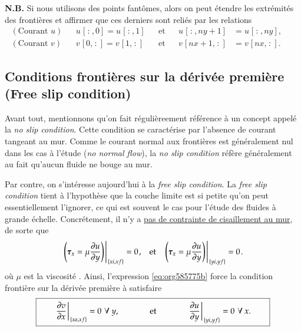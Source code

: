 \documentclass[10pt]{article}
\numberwithin{equation}{section}
\newcommand{\bigno}{\vphantom{\qty(\frac{d}{q})}}
\newcommand{\pt}{\hspace{1pt}}
\begin{document}
\textbf{N.B.} Si nous utilisons des points fantômes, alors on peut étendre les extrémités des frontières et affirmer que ces derniers sont reliés par les relations
\begin{subequations}
\begin{align}
(\text{Courant }u) &&  u\pt[\pt:\pt,0] = u\pt[\pt:\pt,1] && \text{et} && u\pt[\pt:\pt,ny+1] &= u\pt[\pt:\pt,ny],&&\\
(\text{Courant }v) &&  v\pt[0,\pt:\pt] = v\pt[1,\pt:\pt] && \text{et} && v\pt[nx+1,\pt:\pt] &= v\pt[nx,\pt:\pt].&&
\end{align}
\end{subequations}

\subsection{Conditions frontières sur la dérivée première (Free slip condition)}
\label{sec:org659e083}
Avant tout, mentionnons qu'on fait régulièreement référence à un concept appelé la \emph{no slip condition}.
Cette condition se caractérise par l'absence de courant tangeant au mur.
Comme le courant normal aux frontières est généralement nul dans les cas à l'étude (\emph{no normal flow}), la \emph{no slip condition} réfère généralement au fait qu'aucun fluide ne bouge au mur.\bigskip

Par contre, on s'intéresse aujourd'hui à la \emph{free slip condition}.
La \emph{free slip condition} tient à l'hypothèse que la couche limite est si petite qu'on peut essentiellement l'ignorer, ce qui est souvent le cas pour l'étude des fluides à grande échelle.
Concrétement, il n'y a \href{https://physics.stackexchange.com/questions/383096/understanding-free-slip-boundary-condition\#:\~:text=On\%20the\%20other\%20hand\%2C\%20the,the\%20tangential\%20component\%20is\%20unrestricted.}{pas de contrainte de cisaillement au mur}, de sorte que
\begin{align}
\label{eq:org585775b}
&&\eval{\qty(\boldsymbol{\tau}_x = \mu \pdv{u}{y})\pt }_{\pt\{xi,xf\}} = 0\pt, && \text{et} &&
  \eval{\qty(\boldsymbol{\tau}_x = \mu \pdv{u}{y})\pt }_{\pt\{yi,yf\}} = 0\pt. &&
\end{align}
où \(\mu\) est la viscosité \citep{tan2018applying}.
Ainsi, l'expression \ref{eq:org585775b} force la condition frontière sur la dérivée première à satisfaire 
\begin{equation}
\boxed{\hspace{0.7cm}\eval{\pdv{v}{x}\pt }_{\pt\{xa,xf\}} = 0\pt\ \forall\ y,\hspace{1.3cm} \text{et} \hspace{1.3cm} \eval{\pdv{u}{y}\pt }_{\pt \{yi,yf\}} = 0\pt\ \forall\ x.\hspace{0.7cm}\bigno}
\end{equation}
\end{document}
